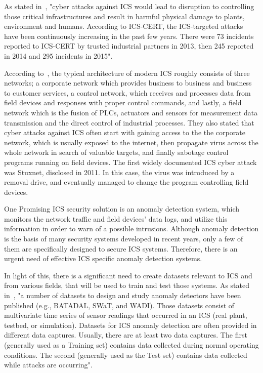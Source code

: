 \documentclass[english,12pt]{article}
\begin{document}
As stated in~\cite{DBLP:conf/dsn/FengLC17}, "cyber attacks against ICS would lead to disruption to controlling those critical
infrastructures and result in harmful physical damage to plants, environment and
humans. According to ICS-CERT, the ICS-targeted attacks have been continuously
increasing in the past few years. There were 73 incidents reported to ICS-CERT
by trusted industrial partners in 2013, then 245 reported in 2014 and 295 incidents
in 2015".

According to~\cite{DBLP:conf/dsn/FengLC17}, the typical architecture of modern ICS roughly consists of three networks;
a corporate network which provides business to business and business to customer services, a control network, which
receives and processes data from field devices and responses with proper control commands, and lastly, a field network
which is the fusion of PLCs, actuators and sensors for measurement data transmission and the direct control of industrial processes.
They also stated that cyber attacks against ICS often start with gaining access to the the corporate network,
which is usually exposed to the internet, then propagate virus across the whole network
in search of valuable targets, and finally sabotage control programs running on field devices. The
first widely documented ICS cyber attack was Stuxnet, disclosed in 2011. In this case,
the virus was introduced by a removal drive, and eventually managed to change the
program controlling field devices.

\pagebreak{}

One Promising ICS security solution is an anomaly detection system, which monitors the network traffic
and field devices' data logs, and utilize this information in order to warn of a possible intrusions.
Although anomaly detection is the basis of many security systems developed in recent years, only a few
of them are specifically designed to secure ICS systems. Therefore, there is an urgent need of effective
ICS specific anomaly detection systems.

In light of this, there is a significant need to create datasets relevant to ICS and from various fields,
that will be used to train and test those systems. As stated in~\cite{DBLP:conf/ccs/TurrinETC20}, "a number of datasets to design and study anomaly
detectors have been published (e.g., BATADAL, SWaT, and WADI). Those datasets consist of multivariate time series
of sensor readings that occurred in an ICS (real plant, testbed, or simulation). Datasets for ICS anomaly detection
are often provided in different data captures. Usually, there are at least two data captures. The first (generally
used as a Training set) contains data collected during normal operating conditions. The second (generally used as the
Test set) contains data collected while attacks are occurring".
\end{document}

